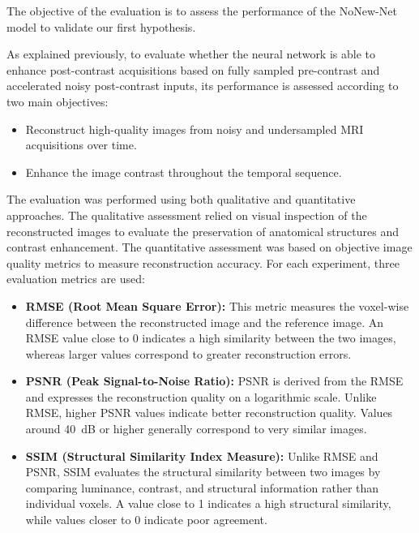 \documentclass[12pt]{article}
\begin{document}
The objective of the evaluation is to assess the performance of the NoNew-Net model to validate our first hypothesis.
\vspace{0.5cm}

As explained previously, to evaluate whether the neural network is able to enhance post-contrast acquisitions based on fully sampled pre-contrast and accelerated noisy post-contrast inputs, its performance is assessed according to two main objectives:
\begin{itemize}
    \item Reconstruct high-quality images from noisy and undersampled MRI acquisitions over time.
    \item Enhance the image contrast throughout the temporal sequence.
\end{itemize}

The evaluation was performed using both qualitative and quantitative approaches. 
The qualitative assessment relied on visual inspection of the reconstructed images to evaluate the preservation of anatomical structures and contrast enhancement. 
The quantitative assessment was based on objective image quality metrics to measure reconstruction accuracy.
For each experiment, three evaluation metrics are used:

\begin{itemize}
    \item \textbf{RMSE (Root Mean Square Error):} This metric measures the voxel-wise difference between the reconstructed image and the reference image. 
    An RMSE value close to 0 indicates a high similarity between the two images, whereas larger values correspond to greater reconstruction errors.
    
    \item \textbf{PSNR (Peak Signal-to-Noise Ratio):} PSNR is derived from the RMSE and expresses the reconstruction quality on a logarithmic scale. 
    Unlike RMSE, higher PSNR values indicate better reconstruction quality. 
    Values around 40~dB or higher generally correspond to very similar images.
    
    \item \textbf{SSIM (Structural Similarity Index Measure):} Unlike RMSE and PSNR, SSIM evaluates the structural similarity between two images by comparing luminance, contrast, and structural information rather than individual voxels. 
    A value close to 1 indicates a high structural similarity, while values closer to 0 indicate poor agreement.
\end{itemize}
\end{document}
